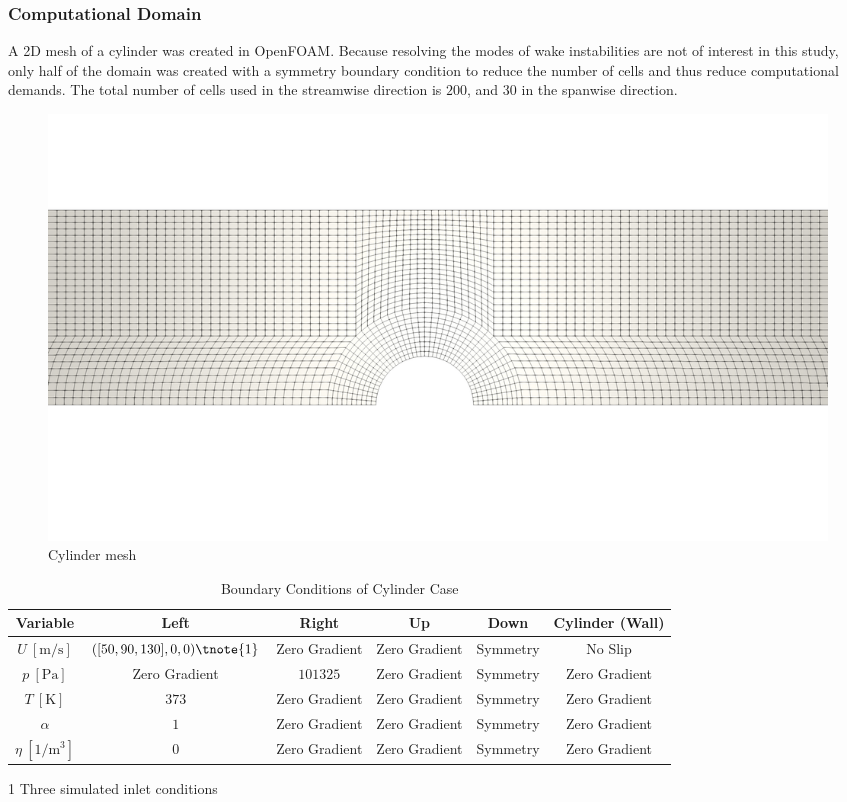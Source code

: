\documentclass[12pt]{article}
\numberwithin{equation}{section}
\begin{document}
\subsubsection{Computational Domain}\label{sss:Methodology-homogeneous-Domain}
A 2D mesh of a cylinder was created in OpenFOAM. Because resolving the modes of wake instabilities are not of interest in this study, only half of the domain was created with a symmetry boundary condition to reduce the number of cells and thus reduce computational demands. The total number of cells used in the streamwise direction is $200$, and $30$ in the spanwise direction.   
\begin{figure}[H]
    \centering
    \includegraphics[trim={0 400 0 300},clip,width=1\textwidth]{Figures/Mesh_Cylinder.png}
    \caption{Cylinder mesh }
    \label{f:cylinderMesh}
\end{figure}
\begin{table}[H]
    \centering
    \begin{threeparttable}[b]
    
    \caption{Boundary Conditions of Cylinder Case}
    \renewcommand{\arraystretch}{1.3}
    \begin{tabular}{||c|c|c|c|c|c||}
    \hline
    \textbf{Variable} & \textbf{Left}& \textbf{Right}& \textbf{Up} & \textbf{Down}& \textbf{Cylinder (Wall)}\\ \hline\hline
     $U \:[\mathrm{m/s}]$&$([50,90,130],0,0)\tnote{1}$&Zero Gradient&Zero Gradient&Symmetry&No Slip\\\hline
     $p \:[\mathrm{Pa}]$&Zero Gradient& $101325$&Zero Gradient&Symmetry&Zero Gradient \\\hline
     $T \:[\mathrm{K}]$&$373$&Zero Gradient&Zero Gradient&Symmetry&Zero Gradient\\ \hline
     $\alpha$&$1$&Zero Gradient&Zero Gradient&Symmetry&Zero Gradient\\\hline
     $\eta\:[\mathrm{1/m^3}]$&$0$&Zero Gradient&Zero Gradient&Symmetry&Zero Gradient\\\hline
     \end{tabular}
     \begin{tablenotes}
        \item [1] Three simulated inlet conditions
    \end{tablenotes}
    \label{t:Cylinder BC}
    \end{threeparttable}
\end{table}
\end{document}
